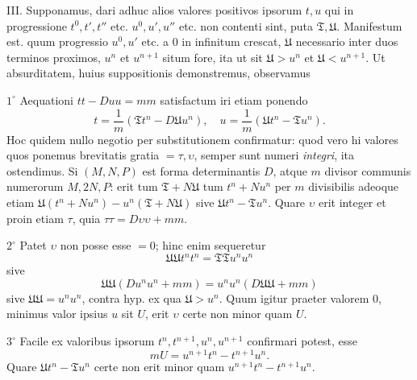 III. Supponamus, dari adhuc alios valores positivos ipsorum \(t,u\) qui in progressione \(t^0,t',t''\) etc. \(u^0,u',u''\) etc. non contenti sint, puta \(\mathfrak{T},\mathfrak{U}\). Manifestum est. quum progressio \(u^0,u'\) etc. a \(0\) in infinitum crescat, \(\mathfrak{U}\) necessario inter duos terminos proximos, \(u^n\) et \(u^{n+1}\) situm fore, ita ut sit \(\mathfrak{U}>u^n\) et \(\mathfrak{U}<u^{n+1}\). Ut absurditatem, huius suppositionis demonstremus, observamus

\(1^\circ\) Aequationi \(tt-Duu=mm\) satisfactum iri etiam ponendo
\[
t=\frac1m(\mathfrak{T}t^n-D\mathfrak{U}u^n),\quad u=\frac1m(\mathfrak{U}t^n-\mathfrak{T}u^n).
\]
Hoc quidem nullo negotio per substitutionem confirmatur: quod vero hi valores quos ponemus brevitatis gratia \(=\tau,\upsilon\), semper sunt numeri \textit{integri}, ita ostendimus. Si \((M,N,P)\) est forma determinantis \(D\), atque \(m\) divisor communis numerorum \(M,2N,P\): erit tum \(\mathfrak{T}+N\mathfrak{U}\) tum \(t^n+Nu^n\) per \(m\) divisibilis adeoque etiam \(\mathfrak{U}(t^n+Nu^n)-u^n(\mathfrak{T}+N\mathfrak{U})\) sive \(\mathfrak{U}t^n-\mathfrak{T}u^n\). Quare \(\upsilon\) erit integer et proin etiam \(\tau\), quia \(\tau\tau=D\upsilon\upsilon+mm\).

\(2^\circ\) Patet \(\upsilon\) non posse esse \(=0\); hinc enim sequeretur
\[
\mathfrak{UU}t^n t^n=\mathfrak{TT}u^n u^n
\]
sive
\[
\mathfrak{UU}(Du^n u^n+mm)=u^n u^n(D\mathfrak{UU}+mm)
\]
sive \(\mathfrak{UU}=u^n u^n\), contra hyp. ex qua \(\mathfrak{U}>u^n\). Quum igitur praeter valorem \(0\), minimus valor ipsius \(u\) sit \(U\), erit \(\upsilon\) certe non minor quam \(U\).

\(3^\circ\) Facile ex valoribus ipsorum \(t^n,t^{n+1},u^n,u^{n+1}\) confirmari potest, esse
\[
mU=u^{n+1}t^n-t^{n+1}u^n.
\]
Quare \(\mathfrak{U}t^n-\mathfrak{T}u^n\) certe non erit minor quam \(u^{n+1}t^n-t^{n+1}u^n\).

